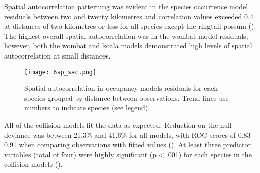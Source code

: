 Spatial autocorrelation patterning was evident in the species occurrence model residuals between two and twenty kilometres and correlation values exceeded 0.4 at distances of two kilometres or less for all species except the ringtail possum (). The highest overall spatial autocorrelation was in the wombat model residuals; however, both the wombat and koala models demonstrated high levels of spatial autocorrelation at small distances.

\begin{figure*}[htp]
  \centering
  \texttt{[image: 6sp\_sac.png]}
  \caption[]{Spatial autocorrelation in occupancy models residuals for each species grouped by distance between observations. Trend lines use numbers to indicate species (see legend).}
  \label{6sp_sac}
\end{figure*}

All of the collision models fit the data as expected.  Reduction on the null deviance was between 21.3\% and 41.6\% for all models, with ROC scores of 0.83-0.91 when comparing observations with fitted values (). At least three predictor variables (total of four) were highly significant (p$<$.001) for each species in the collision models ().

